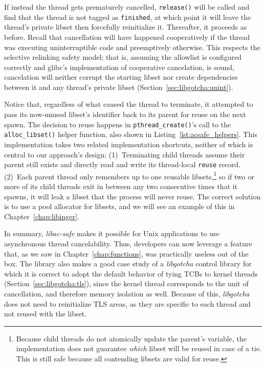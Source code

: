 If instead the thread gets prematurely cancelled, \texttt{release()} will be called
and find that the thread is not tagged as \texttt{finished}, at which point it will
leave the thread's private libset then forcefully reinitialize it.  Thereafter, it
proceeds as before.  Recall that cancellation will have happened cooperatively if the
thread was executing uninterruptible code and preemptively otherwise.  This respects
the selective relinking safety model; that is, assuming the allowlist is configured
correctly and glibc's implementation of cooperative cancelation, is sound,
cancelation will neither corrupt the starting libset nor create dependencies between
it and any thread's private libset (Section~\ref{sec:libgotcha:unint}).

Notice that, regardless of what caused the thread to terminate, it attempted to pass
its now-unused libset's identifier back to its parent for reuse on the next spawn.
The decision to reuse happens in \texttt{pthread\_create()}'s call to the
\texttt{alloc\_libset()} helper function, also shown in
Listing~\ref{lst:acsafe_helpers}.  This implementation takes two related
implementation shortcuts, neither of which is central to our approach's design:
(1)~Terminating child threads assume their parent still exists and directly read and
write its thread-local \texttt{reuse} record.  (2)~Each parent thread only remembers
up to one reusable libsets,\footnote{Because child threads do not atomically update
the parent's variable, the implementation does not guarantee \textit{which} libset
will be reused in case of a tie.  This is still safe because all contending libsets
are valid for reuse.} so if two or more of its child threads exit in between
any two consecutive times that it spawns, it will leak a libset that the process will
never reuse.  The correct solution is to use a pool allocator for libsets, and we
will see an example of this in Chapter~\ref{chap:libinger}.

In summary, \textit{libac-safe} makes it possible for Unix applications to use
asynchronous thread cancelability.  Thus, developers can now leverage a feature that,
as we saw in Chapter~\ref{chap:functions}, was practically useless out of the box.
The library also makes a good case study of a \textit{libgotcha} control library for
which it is correct to adopt the default behavior of tying TCBs to kernel threads
(Section~\ref{sec:libgotcha:tls}), since the kernel thread corresponds to the unit of
cancellation, and therefore memory isolation as well.  Because of this,
\textit{libgotcha} does not need to reinitialize TLS areas, as they are specific to
each thread and not reused with the libset.

